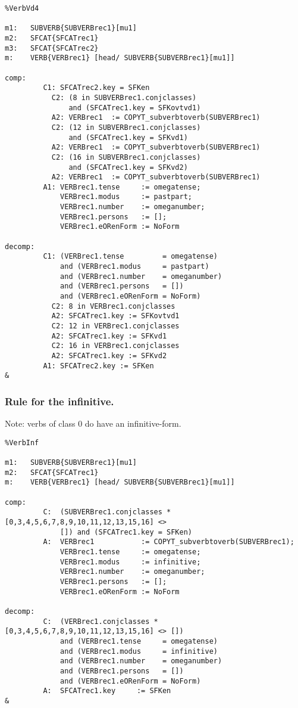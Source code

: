 \begin{verbatim}
%VerbVd4 

m1:   SUBVERB{SUBVERBrec1}[mu1]
m2:   SFCAT{SFCATrec1}
m3:   SFCAT{SFCATrec2}
m:    VERB{VERBrec1} [head/ SUBVERB{SUBVERBrec1}[mu1]]

comp:
         C1: SFCATrec2.key = SFKen
           C2: (8 in SUBVERBrec1.conjclasses)
               and (SFCATrec1.key = SFKovtvd1) 
           A2: VERBrec1  := COPYT_subverbtoverb(SUBVERBrec1)
           C2: (12 in SUBVERBrec1.conjclasses) 
               and (SFCATrec1.key = SFKvd1) 
           A2: VERBrec1  := COPYT_subverbtoverb(SUBVERBrec1)
           C2: (16 in SUBVERBrec1.conjclasses) 
               and (SFCATrec1.key = SFKvd2) 
           A2: VERBrec1  := COPYT_subverbtoverb(SUBVERBrec1)
         A1: VERBrec1.tense     := omegatense;
             VERBrec1.modus     := pastpart;
             VERBrec1.number    := omeganumber;
             VERBrec1.persons   := [];
             VERBrec1.eORenForm := NoForm

decomp:
         C1: (VERBrec1.tense         = omegatense) 
             and (VERBrec1.modus     = pastpart)
             and (VERBrec1.number    = omeganumber)
             and (VERBrec1.persons   = []) 
             and (VERBrec1.eORenForm = NoForm)
           C2: 8 in VERBrec1.conjclasses 
           A2: SFCATrec1.key := SFKovtvd1 
           C2: 12 in VERBrec1.conjclasses 
           A2: SFCATrec1.key := SFKvd1
           C2: 16 in VERBrec1.conjclasses 
           A2: SFCATrec1.key := SFKvd2 
         A1: SFCATrec2.key := SFKen
&
\end{verbatim}
\newpage
\subsubsection{Rule for the infinitive.}

Note: verbs of class 0 do have an infinitive-form.

\begin{verbatim}
%VerbInf 

m1:   SUBVERB{SUBVERBrec1}[mu1]
m2:   SFCAT{SFCATrec1}
m:    VERB{VERBrec1} [head/ SUBVERB{SUBVERBrec1}[mu1]]

comp:
         C:  (SUBVERBrec1.conjclasses * [0,3,4,5,6,7,8,9,10,11,12,13,15,16] <> 
             []) and (SFCATrec1.key = SFKen)
         A:  VERBrec1           := COPYT_subverbtoverb(SUBVERBrec1);
             VERBrec1.tense     := omegatense;
             VERBrec1.modus     := infinitive;
             VERBrec1.number    := omeganumber;
             VERBrec1.persons   := [];
             VERBrec1.eORenForm := NoForm

decomp:
         C:  (VERBrec1.conjclasses * [0,3,4,5,6,7,8,9,10,11,12,13,15,16] <> [])
             and (VERBrec1.tense     = omegatense) 
             and (VERBrec1.modus     = infinitive)
             and (VERBrec1.number    = omeganumber)
             and (VERBrec1.persons   = []) 
             and (VERBrec1.eORenForm = NoForm) 
         A:  SFCATrec1.key     := SFKen
&
\end{verbatim}
\newpage
